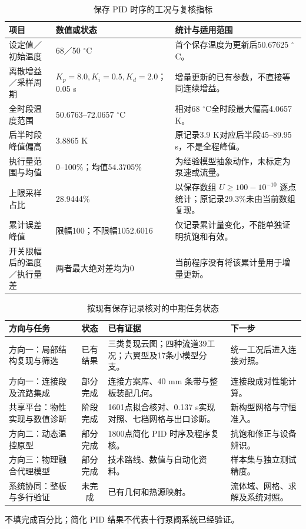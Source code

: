 \documentclass[UTF8]{midterm}
\begin{document}
\clearpage
\setcounter{section}{3}
\setcounter{table}{10}
\begin{table}[!htbp]\centering\small
\caption{保存 PID 时序的工况与复核指标}\label{tab:11}
\begin{tabularx}{\linewidth}{@{}Y Y Y@{}}\toprule
{} 项目 & 数值或状态 & 统计与适用范围 \\\midrule
设定值／初始温度 & 68／50 $^\circ$C & 首个保存温度为更新后50.67625 $^\circ$C。\\
离散增益／采样周期 & $K_p=8.0,K_i=0.5,K_d=2.0$；0.05 s & 增量更新的已有参数，不直接等同连续增益。\\
全时段温度范围 & 50.6763--72.0657 $^\circ$C & 相对68 $^\circ$C全时段最大偏高4.0657 K。\\
后半时段峰值偏高 & 3.8865 K & 原记录3.9 K对应后半段45--89.95 s，不是全程峰值。\\
执行量范围与均值 & 0--100\%；均值54.3705\% & 为经验模型抽象动作，未标定为泵速或流量。\\
上限采样占比 & 28.9444\% & 以保存数组 $U\ge100-10^{-10}$ 逐点统计；原记录29.3\%未由当前数组复现。\\
累计误差峰值 & 限幅100；不限幅1052.6016 & 仅记录累计量变化，不能单独证明抗饱和有效。\\
开关限幅后的温度／执行量差 & 两者最大绝对差均为0 & 当前程序没有将该累计量用于增量更新。\\
\bottomrule\end{tabularx}\end{table}
\clearpage
\setcounter{section}{3}
\setcounter{table}{11}
\begin{table}[!htbp]\centering\small
\caption{按现有保存记录核对的中期任务状态}\label{tab:monthly_status}
\begin{tabularx}{\linewidth}{@{}>{\hsize}Y c >{\hsize}Y >{\hsize}Y@{}}
\toprule
{} 方向与任务 & 状态 & 已有证据 & 下一步 \\
\midrule
方向一：局部结构复现与筛选 & 已有结果 & 三类复现云图；四种流道39工况；六翼型及17条小模型分支。 & 统一工况后进入连接对照。 \\
方向一：连接段及流路集成 & 部分完成 & 连接方案库、40 mm 条带与整板装配几何。 & 连接段成对性能计算。 \\
共享平台：物性实现与数值诊断 & 阶段完成 & 1601点拟合核对、0.137 s实现对照、七档网格与出口诊断。 & 新构型网格与守恒准入。 \\
方向二：动态温控原型 & 部分完成 & 1800点简化 PID 时序及程序复核。 & 抗饱和修正与设备辨识。 \\
方向三：物理融合代理模型 & 部分完成 & 技术路线、数值与自动化资料。 & 样本集与独立测试精度。 \\
系统协同：整板与多行验证 & 未完成 & 已有几何和热源映射。 & 流体域、网格、求解及系统对照。 \\
\bottomrule\end{tabularx}
\par\smallskip\begin{minipage}{\linewidth}\footnotesize 不填完成百分比；简化 PID 结果不代表十行泵阀系统已经验证。\end{minipage}
\end{table}
\end{document}
